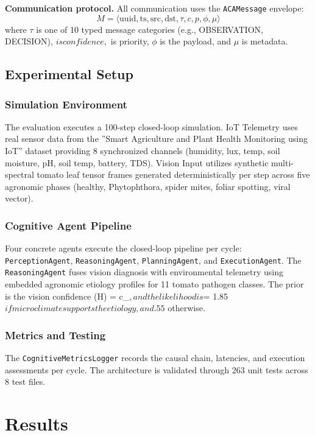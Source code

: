 \documentclass[journal, twocolumn]{IEEEtran}
\begin{document}
\textbf{Communication protocol.} All communication uses the \texttt{ACAMessage} envelope:
\begin{equation}
M = \langle \text{uuid}, \text{ts}, \text{src}, \text{dst}, \tau, c, p, \phi, \mu \rangle
\end{equation}
where $\tau$ is one of 10 typed message categories (e.g., OBSERVATION, DECISION),  \in [0,1]$ is confidence, $ is priority, $\phi$ is the payload, and $\mu$ is metadata.

\subsection{Experimental Setup}
\subsubsection{Simulation Environment}
The evaluation executes a 100-step closed-loop simulation. IoT Telemetry uses real sensor data from the ''Smart Agriculture and Plant Health Monitoring using IoT'' dataset providing 8 synchronized channels (humidity, lux, temp, soil moisture, pH, soil temp, battery, TDS). Vision Input utilizes synthetic multi-spectral tomato leaf tensor frames generated deterministically per step across five agronomic phases (healthy, Phytophthora, spider mites, foliar spotting, viral vector).

\subsubsection{Cognitive Agent Pipeline}
Four concrete agents execute the closed-loop pipeline per cycle: \texttt{PerceptionAgent}, \texttt{ReasoningAgent}, \texttt{PlanningAgent}, and \texttt{ExecutionAgent}. The \texttt{ReasoningAgent} fuses vision diagnosis with environmental telemetry using embedded agronomic etiology profiles for 11 tomato pathogen classes. The prior is the vision confidence (H) = c_{}$, and the likelihood is $\Lambda = 1.85$ if microclimate supports the etiology, and .55$ otherwise.

\subsubsection{Metrics and Testing}
The \texttt{CognitiveMetricsLogger} records the causal chain, latencies, and execution assessments per cycle. The architecture is validated through 263 unit tests across 8 test files.

\section{Results}
\end{document}

